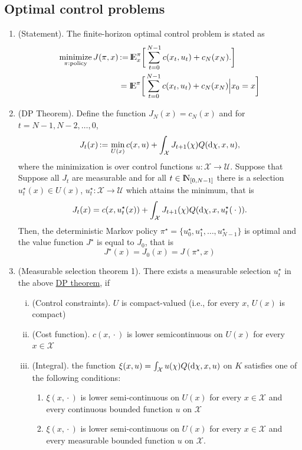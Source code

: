 \documentclass[a4paper,10pt]{scrbook}
\begin{document}
\subsection{Optimal control problems}
\begin{enumerate}
 \item (Statement). The finite-horizon optimal control problem is stated as 
 \begin{align*}
  \minimize_{\pi: \text{policy}} J(\pi,x) &\dfn \E_x^\pi\bigg[
    \sum_{t=0}^{N-1}c(x_t, u_t) + c_N(x_N).
  \bigg]\\
  &=\E^\pi\bigg[
    \sum_{t=0}^{N-1}c(x_t, u_t) + c_N(x_N) {}\Big|{} x_0 = x
  \bigg]
 \end{align*}
 \item \label{item:mdp:dp_theorem}
 (\hypertarget{link:dp_thm}{DP Theorem}). Define the function $J_N(x) = c_N(x)$ and for $t=N-1,N-2,\ldots, 0$, 
 \[
  J_t(x) {}\mathop{\mathrel{:}=}{} \min_{U(x)} 
      c(x,u) + \int_{\mathcal{X}}J_{t+1}(\chi)Q(\mathrm{d}\chi, x, u),
 \]
 where the minimization is over control functions \(u:\mathcal{X}\to\mathcal{U}\). Suppose that 
Suppose all \(J_t\) are measurable and for all \(t\in\N_{[0,N-1]}\) there 
 is a selection \(u_t^\star(x)\in U(x)\), \(u_t^\star: \mathcal{X}\to\mathcal{U}\) which attains the minimum, that is
 \[
  J_t(x) = c(x,u_t^\star(x)) + \int_{\mathcal{X}}J_{t+1}(\chi)Q(\mathrm{d}\chi, x, u_t^\star({}\cdot{})).
 \]
 Then, the deterministic Markov policy \(\pi^\star=\{u_0^\star, u_1^\star, \ldots, u_{N-1}^\star\}\)
 is optimal and the value function \(J^\star\) is equal to \(J_0\), that is
 \[
  J^\star(x) = J_0(x) = J(\pi^\star, x)
 \]
 \item (\hypertarget{link:mst1}{Measurable selection theorem 1}). There exists a measurable selection \(u_t^\star\) 
       in the above \hyperlink{link:dp_thm}{DP theorem}, if 
       \begin{enumerate}[i.]
        \item (Control constraints). \(U\) is compact-valued (i.e., for every \(x\), \(U(x)\) is compact)
        \item (Cost function). \(c(x, {}\cdot{})\) is lower semicontinuous on \(U(x)\) for every \(x\in\mathcal{X}\)
        \item (Integral). the function \(\xi(x, u) = \int_{\mathcal{X}} u(\chi) Q(\mathrm{d} \chi, x, u)\) on \(K\) satisfies 
              one of the following conditions:
              \begin{enumerate}
               \item \(\xi(x, {}\cdot{})\) is lower semi-continuous on \(U(x)\) for every \(x\in \mathcal{X}\) and every 
                      continuous bounded function \(u\) on \(\mathcal{X}\)
               \item \(\xi(x, {}\cdot{})\) is lower semi-continuous on \(U(x)\) for every \(x\in \mathcal{X}\) and every 
                      measurable bounded function \(u\) on \(\mathcal{X}\).
              \end{enumerate}
       \end{enumerate}


\end{enumerate}
\end{document}
